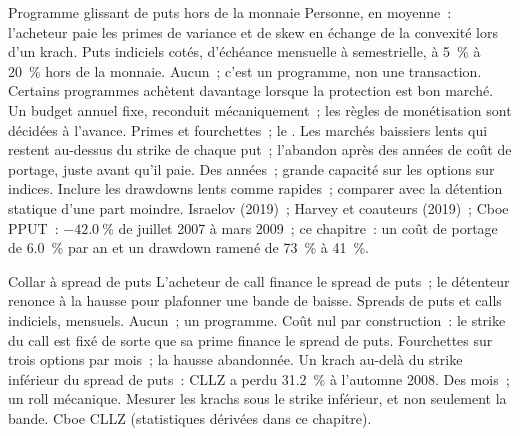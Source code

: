 \begin{strategyfile}{Programme glissant de puts hors de la monnaie}\label{strat:s2:tail-hedging-and-long-volatility:puts}
 Personne, en moyenne~: l'acheteur paie les primes de variance et de skew en échange de la convexité lors d'un krach.
 Puts indiciels cotés, d'échéance mensuelle à semestrielle, à 5~\% à 20~\% hors de la monnaie.
 Aucun~; c'est un programme, non une transaction. Certains programmes achètent davantage lorsque la protection est bon marché.
 Un budget annuel fixe, reconduit mécaniquement~; les règles de monétisation sont décidées à l'avance.
 Primes et fourchettes~; le .
 Les marchés baissiers lents qui restent au-dessus du strike de chaque put~; l'abandon après des années de coût de portage, juste avant qu'il paie.
 Des années~; grande capacité sur les options sur indices.
 Inclure les drawdowns lents comme rapides~; comparer avec la détention statique d'une part moindre.
 Israelov (2019)~; Harvey et coauteurs (2019)~; Cboe PPUT~: $-42.0~\%$ de juillet 2007 à mars 2009~; ce chapitre~: un coût de portage de 6.0~\% par an
et un drawdown ramené de 73~\% à 41~\%.
\end{strategyfile}

\begin{strategyfile}{Collar à spread de puts}\label{strat:s2:tail-hedging-and-long-volatility:collar}
 L'acheteur de call finance le spread de puts~; le détenteur renonce à la hausse pour plafonner une bande de baisse.
 Spreads de puts et calls indiciels, mensuels.
 Aucun~; un programme.
 Coût nul par construction~: le strike du call est fixé de sorte que sa prime finance le spread de puts.
 Fourchettes sur trois options par mois~; la hausse abandonnée.
 Un krach au-delà du strike inférieur du spread de puts~: CLLZ a perdu 31.2~\% à l'automne 2008.
 Des mois~; un roll mécanique.
 Mesurer les krachs sous le strike inférieur, et non seulement la bande.
 Cboe CLLZ (statistiques dérivées dans ce chapitre).
\end{strategyfile}

